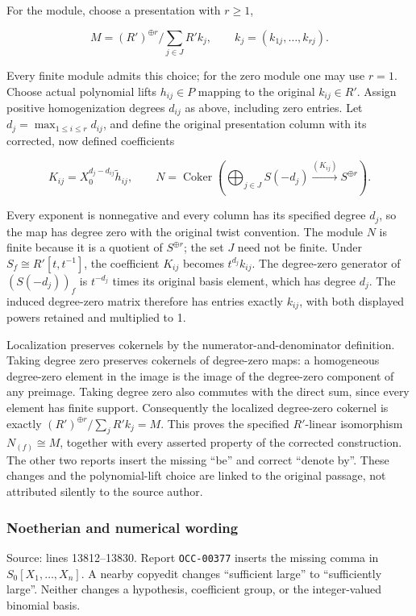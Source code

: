 For the module, choose a presentation with \(r\geq1\),

\[
M=(R')^{\oplus r}/\sum_{j\in J}R'k_j,\qquad
k_j=(k_{1j},\ldots,k_{rj}).
\]

Every finite module admits this choice; for the zero module one may use \(r=1\). Choose actual polynomial lifts \(h_{ij}\in P\) mapping to the original \(k_{ij}\in R'\). Assign positive homogenization degrees \(d_{ij}\) as above, including zero entries. Let \(d_j=\max_{1\leq i\leq r}d_{ij}\), and define the original presentation column with its corrected, now defined coefficients

\[
K_{ij}=X_0^{d_j-d_{ij}}\widetilde h_{ij},\qquad
N=\operatorname{Coker}\left(\bigoplus_{j\in J}S(-d_j)
 \xrightarrow{(K_{ij})} S^{\oplus r}\right).
\]

Every exponent is nonnegative and every column has its specified degree \(d_j\), so the map has degree zero with the original twist convention. The module \(N\) is finite because it is a quotient of \(S^{\oplus r}\); the set \(J\) need not be finite. Under \(S_f\cong R'[t,t^{-1}]\), the coefficient \(K_{ij}\) becomes \(t^{d_j}k_{ij}\). The degree-zero generator of \((S(-d_j))_f\) is \(t^{-d_j}\) times its original basis element, which has degree \(d_j\). The induced degree-zero matrix therefore has entries exactly \(k_{ij}\), with both displayed powers retained and multiplied to 1.

Localization preserves cokernels by the numerator-and-denominator definition. Taking degree zero preserves cokernels of degree-zero maps: a homogeneous degree-zero element in the image is the image of the degree-zero component of any preimage. Taking degree zero also commutes with the direct sum, since every element has finite support. Consequently the localized degree-zero cokernel is exactly \((R')^{\oplus r}/\sum_j R'k_j=M\). This proves the specified \(R'\)-linear isomorphism \(N_{(f)}\cong M\), together with every asserted property of the corrected construction. The other two reports insert the missing ``be'' and correct ``denote by''. These changes and the polynomial-lift choice are linked to the original passage, not attributed silently to the source author.

\subsubsection{Noetherian and numerical wording}\label{algebra-proof-002-noetherian-and-numerical-wording}

Source: lines 13812--13830. Report \texttt{OCC-00377} inserts the missing comma in \(S_0[X_1,\ldots,X_n]\). A nearby copyedit changes ``sufficient large'' to ``sufficiently large''. Neither changes a hypothesis, coefficient group, or the integer-valued binomial basis.

